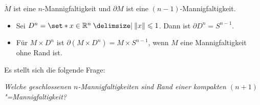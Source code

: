 \begin{bemerkung}[{name=[Der Rand ist eine $(n-1)$-Mannigfaltigkeit]}]
	$\mathring{M}$ ist eine $n$-Mannigfaltigkeit und $\partial M$ ist eine $(n-1)$-Mannigfaltigkeit.
\end{bemerkung}

\begin{beispiel}[{name=[Mannigfaltigkeiten mit Rand]}]
	\leavevmode
	\begin{itemize}[itemsep=0pt]
		\item Sei $D^n = \set*{x \in \mathbb{R}^n \given \norm*{x}\le 1}$. Dann ist $\partial D^n = S^{n-1}$.
		\item Für $M \times D^n$ ist $\partial (M \times D^n) = M \times S^{n-1}$, wenn $M$ eine Mannigfaltigkeit ohne Rand ist.
	\end{itemize}
	Es stellt sich die folgende Frage: 
	\begin{center}
		\emph{Welche geschlossenen $n$-Mannigfaltigkeiten sind Rand einer kompakten $(n+1)$"=Mannigfaltigkeit?}
	\end{center}
\end{beispiel}

